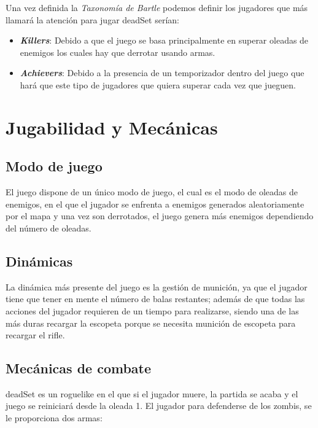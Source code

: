 \documentclass[12pt]{article}
\begin{document}
            \vspace{5mm}
    
            Una vez definida la \textit{Taxonomía de Bartle} \cite{bartle} podemos definir los jugadores que más llamará la atención para jugar \textunderscore deadSet serían: 
                \begin{itemize}
                    \item \textit{\textbf{Killers}}: Debido a que el juego se basa principalmente en superar oleadas de enemigos los cuales hay que derrotar usando armas.
                    \item \textit{\textbf{Achievers}}: Debido a la presencia de un temporizador dentro del juego que hará que este tipo de jugadores que quiera superar cada vez que jueguen.
                \end{itemize}


\section{Jugabilidad y Mecánicas}
    \subsection{Modo de juego}
        El juego dispone de un único modo de juego, el cual es el modo de oleadas de enemigos, en el que el jugador se enfrenta a enemigos generados aleatoriamente por el mapa y una vez son derrotados, el juego genera más enemigos dependiendo del número de oleadas.\\

    \subsection{Dinámicas}
        La dinámica más presente del juego es la gestión de munición, ya que el jugador tiene que tener en mente el número de balas restantes; además de que todas las acciones del jugador requieren de un tiempo para realizarse, siendo una de las más duras recargar la escopeta porque se necesita munición de escopeta para recargar el rifle. \\
    
    \subsection{Mecánicas de combate}
        \textunderscore deadSet es un roguelike en el que si el jugador muere, la partida se acaba y el juego se reiniciará desde la oleada 1. El jugador para defenderse de los zombis, se le proporciona dos armas:
        
\end{document}
